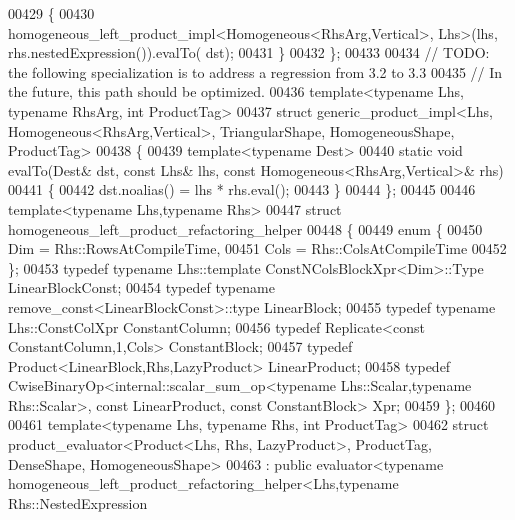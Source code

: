 \begin{DoxyCode}
00429   \{
00430     homogeneous\_left\_product\_impl<Homogeneous<RhsArg,Vertical>, Lhs>(lhs, rhs.nestedExpression()).evalTo(
      dst);
00431   \}
00432 \};
00433 
00434 \textcolor{comment}{// TODO: the following specialization is to address a regression from 3.2 to 3.3}
00435 \textcolor{comment}{// In the future, this path should be optimized.}
00436 \textcolor{keyword}{template}<\textcolor{keyword}{typename} Lhs, \textcolor{keyword}{typename} RhsArg, \textcolor{keywordtype}{int} ProductTag>
00437 \textcolor{keyword}{struct }generic\_product\_impl<Lhs, Homogeneous<RhsArg,Vertical>, TriangularShape, HomogeneousShape, 
      ProductTag>
00438 \{
00439   \textcolor{keyword}{template}<\textcolor{keyword}{typename} Dest>
00440   \textcolor{keyword}{static} \textcolor{keywordtype}{void} evalTo(Dest& dst, \textcolor{keyword}{const} Lhs& lhs, \textcolor{keyword}{const} Homogeneous<RhsArg,Vertical>& rhs)
00441   \{
00442     dst.noalias() = lhs * rhs.eval();
00443   \}
00444 \};
00445 
00446 \textcolor{keyword}{template}<\textcolor{keyword}{typename} Lhs,\textcolor{keyword}{typename} Rhs>
00447 \textcolor{keyword}{struct }homogeneous\_left\_product\_refactoring\_helper
00448 \{
00449   \textcolor{keyword}{enum} \{
00450     Dim = Rhs::RowsAtCompileTime,
00451     Cols = Rhs::ColsAtCompileTime
00452   \};
00453   \textcolor{keyword}{typedef} \textcolor{keyword}{typename} Lhs::template ConstNColsBlockXpr<Dim>::Type          LinearBlockConst;
00454   \textcolor{keyword}{typedef} \textcolor{keyword}{typename} remove\_const<LinearBlockConst>::type                 LinearBlock;
00455   \textcolor{keyword}{typedef} \textcolor{keyword}{typename} Lhs::ConstColXpr                                     ConstantColumn;
00456   \textcolor{keyword}{typedef} Replicate<const ConstantColumn,1,Cols>                        ConstantBlock;
00457   \textcolor{keyword}{typedef} Product<LinearBlock,Rhs,LazyProduct>                          LinearProduct;
00458   \textcolor{keyword}{typedef} CwiseBinaryOp<internal::scalar\_sum\_op<typename Lhs::Scalar,typename Rhs::Scalar>, \textcolor{keyword}{const} 
      LinearProduct, \textcolor{keyword}{const} ConstantBlock> Xpr;
00459 \};
00460 
00461 \textcolor{keyword}{template}<\textcolor{keyword}{typename} Lhs, \textcolor{keyword}{typename} Rhs, \textcolor{keywordtype}{int} ProductTag>
00462 \textcolor{keyword}{struct }product\_evaluator<Product<Lhs, Rhs, LazyProduct>, ProductTag, DenseShape, HomogeneousShape>
00463  : \textcolor{keyword}{public} evaluator<typename homogeneous\_left\_product\_refactoring\_helper<Lhs,typename Rhs::NestedExpression

\end{DoxyCode}
